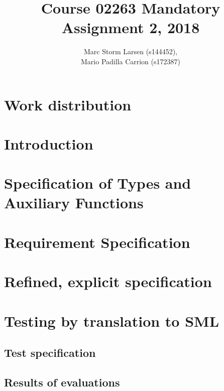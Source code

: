 \documentclass[a4]{article}
\title{Course 02263 Mandatory Assignment 2, 2018}
\author{Marc Storm Larsen (s144452),\\ 
        Mario Padilla Carrion (s172387)}
\begin{document}
\maketitle

\tableofcontents
\newpage

\section{Work distribution}

\section{Introduction}

\section{Specification of Types and Auxiliary Functions}

%  

\section{Requirement Specification}

%  

\section{Refined, explicit specification}

%  

\section{Testing by translation to SML}

\subsection{Test specification}

%

\subsection{Results of evaluations}
\end{document}
